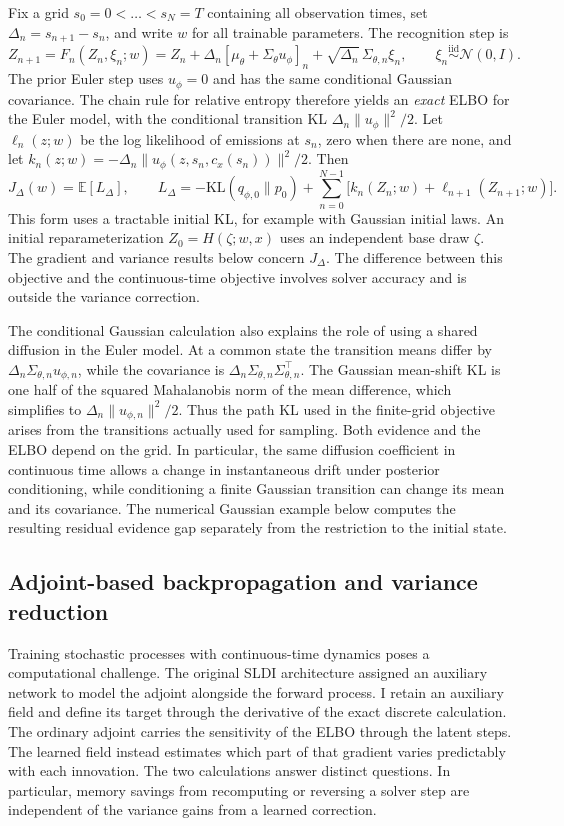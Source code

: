 \documentclass[12pt]{article}
\newcommand{\E}{\mathbb{E}}
\newcommand{\KL}{\mathrm{KL}}
\newcommand{\N}{\mathcal{N}}
\begin{document}
Fix a grid \(s_0=0<\dots<s_N=T\) containing all observation times, set \(\Delta_n=s_{n+1}-s_n\), and write \(w\) for all trainable parameters. The recognition step is
\[
 Z_{n+1}=F_n(Z_n,\xi_n;w)
 =Z_n+\Delta_n[\mu_\theta+\Sigma_\theta u_\phi]_n
   +\sqrt{\Delta_n}\,\Sigma_{\theta,n}\xi_n,\qquad
 \xi_n\stackrel{\mathrm{iid}}{\sim}\N(0,I).
\]
The prior Euler step uses \(u_\phi=0\) and has the same conditional Gaussian covariance. The chain rule for relative entropy therefore yields an \emph{exact} ELBO for the Euler model, with the conditional transition KL \(\Delta_n\|u_\phi\|^2/2\). Let \(\ell_n(z;w)\) be the log likelihood of emissions at \(s_n\), zero when there are none, and let \(k_n(z;w)=-\Delta_n\|u_\phi(z,s_n,c_x(s_n))\|^2/2\). Then
\[
 J_\Delta(w)=\E\!\left[L_\Delta\right],\qquad
 L_\Delta = -\KL(q_{\phi,0}\|p_0)+
             \sum_{n=0}^{N-1}\bigl[k_n(Z_n;w)+\ell_{n+1}(Z_{n+1};w)\bigr].
\]
This form uses a tractable initial KL, for example with Gaussian initial laws. An initial reparameterization \(Z_0=H(\zeta;w,x)\) uses an independent base draw \(\zeta\). The gradient and variance results below concern \(J_\Delta\). The difference between this objective and the continuous-time objective involves solver accuracy and is outside the variance correction.

The conditional Gaussian calculation also explains the role of using a shared diffusion in the Euler model. At a common state the transition means differ by \(\Delta_n\Sigma_{\theta,n}u_{\phi,n}\), while the covariance is \(\Delta_n\Sigma_{\theta,n}\Sigma_{\theta,n}^\top\). The Gaussian mean-shift KL is one half of the squared Mahalanobis norm of the mean difference, which simplifies to \(\Delta_n\|u_{\phi,n}\|^2/2\). Thus the path KL used in the finite-grid objective arises from the transitions actually used for sampling. Both evidence and the ELBO depend on the grid. In particular, the same diffusion coefficient in continuous time allows a change in instantaneous drift under posterior conditioning, while conditioning a finite Gaussian transition can change its mean and its covariance. The numerical Gaussian example below computes the resulting residual evidence gap separately from the restriction to the initial state.

\subsection*{Adjoint-based backpropagation and variance reduction}

Training stochastic processes with continuous-time dynamics poses a computational challenge. The original SLDI architecture assigned an auxiliary network to model the adjoint alongside the forward process. I retain an auxiliary field and define its target through the derivative of the exact discrete calculation. The ordinary adjoint carries the sensitivity of the ELBO through the latent steps. The learned field instead estimates which part of that gradient varies predictably with each innovation. The two calculations answer distinct questions. In particular, memory savings from recomputing or reversing a solver step are independent of the variance gains from a learned correction.
\end{document}
